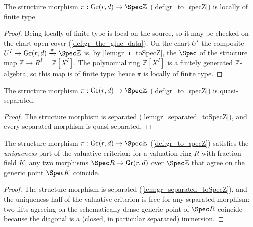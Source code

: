 \begin{lemma}\leanok
  \label{lem:gr_locallyOfFiniteType_toSpecZ}
  The structure morphism \(\pi : \mathrm{Gr}(r,d) \to \Spec \mathbb{Z}\)
  (\cref{def:gr_to_specZ}) is locally of finite type.
\end{lemma}
\begin{proof}
  \leanok
  Being locally of finite type is local on the source, so it may be checked on the
  chart open cover (\cref{def:gr_the_glue_data}). On the chart \(U^I\) the composite
  \(U^I \to \mathrm{Gr}(r,d) \xrightarrow{\pi} \Spec \mathbb{Z}\) is, by
  \cref{lem:gr_ι_toSpecZ}, the \(\Spec\) of the structure map \(\mathbb{Z} \to R^I
  = \mathbb{Z}[X^I]\). The polynomial ring \(\mathbb{Z}[X^I]\) is a finitely
  generated \(\mathbb{Z}\)-algebra, so this map is of finite type; hence \(\pi\) is
  locally of finite type.
\end{proof}

\begin{lemma}\leanok
  \label{lem:gr_quasiSeparated_toSpecZ}
  The structure morphism \(\pi : \mathrm{Gr}(r,d) \to \Spec \mathbb{Z}\)
  (\cref{def:gr_to_specZ}) is quasi-separated.
\end{lemma}
\begin{proof}
  \leanok
  The structure morphism is separated (\cref{lem:gr_separated_toSpecZ}), and every
  separated morphism is quasi-separated.
\end{proof}

\begin{lemma}\leanok
  \label{lem:gr_valuativeUniqueness_toSpecZ}
  The structure morphism \(\pi : \mathrm{Gr}(r,d) \to \Spec \mathbb{Z}\)
  (\cref{def:gr_to_specZ}) satisfies the \emph{uniqueness} part of the valuative
  criterion: for a valuation ring \(R\) with fraction field \(K\), any two
  morphisms \(\Spec R \to \mathrm{Gr}(r,d)\) over \(\Spec \mathbb{Z}\) that agree
  on the generic point \(\Spec K\) coincide.
\end{lemma}
\begin{proof}
  \leanok
  The structure morphism is separated (\cref{lem:gr_separated_toSpecZ}), and the
  uniqueness half of the valuative criterion is free for any separated morphism:
  two lifts agreeing on the schematically dense generic point of \(\Spec R\)
  coincide because the diagonal is a (closed, in particular separated) immersion.
\end{proof}

